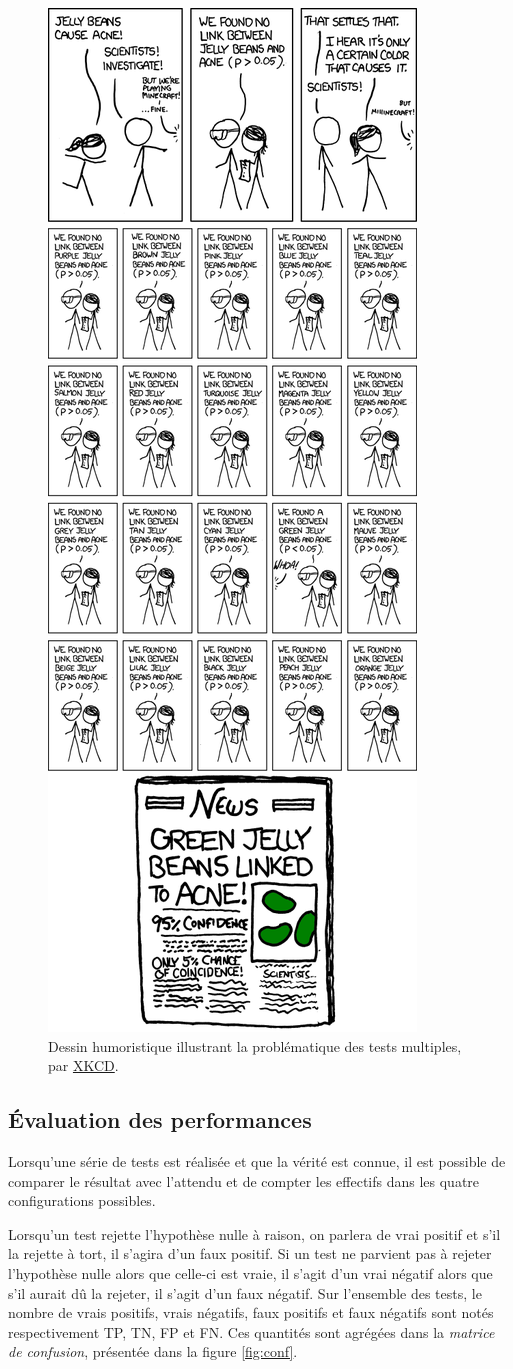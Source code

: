 \documentclass[12pt,a4paper]{reedthesis}
\theoremstyle{definition}
\theoremstyle{definition}
\theoremstyle{definition}
\theoremstyle{remark}
\begin{document}
\begin{figure}

{\centering \includegraphics[width=0.4\linewidth]{img/significant} 

}

\caption{Dessin humoristique illustrant la problématique des tests multiples, par \href{https://xkcd.com/882}{XKCD}.}\label{fig:xkcd}
\end{figure}
\hypertarget{uxe9valuation-des-performances}{%
\subsection{Évaluation des performances}\label{uxe9valuation-des-performances}}

Lorsqu'une série de tests est réalisée et que la vérité est connue, il est possible de comparer le résultat avec l'attendu et de compter les effectifs dans les quatre configurations possibles.

Lorsqu'un test rejette l'hypothèse nulle à raison, on parlera de vrai positif et s'il la rejette à tort, il s'agira d'un faux positif. Si un test ne parvient pas à rejeter l'hypothèse nulle alors que celle-ci est vraie, il s'agit d'un vrai négatif alors que s'il aurait dû la rejeter, il s'agit d'un faux négatif.
Sur l'ensemble des tests, le nombre de vrais positifs, vrais négatifs, faux positifs et faux négatifs sont notés respectivement TP, TN, FP et FN. Ces quantités sont agrégées dans la \emph{matrice de confusion}, présentée dans la figure \ref{fig:conf}.
\end{document}
